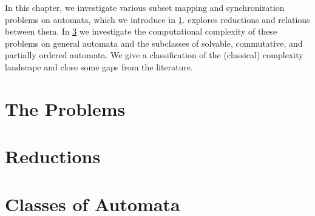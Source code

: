 
In this chapter, we investigate various subset mapping and synchronization problems on automata,
which we introduce in \cref{compl:sec:problems}.
 explores
reductions and relations between them.
In \cref{compl:sec:subclasses} we investigate the computational
complexity of these problems on general automata
and the subclasses of solvable, commutative, and partially
ordered automata. We give a classification of the (classical) 
complexity landscape and close some gaps from the literature.

\section{The Problems}
\label{compl:sec:problems}



\section{Reductions}
\label{compl:sec:reductions}



\section{Classes of Automata}
\label{compl:sec:subclasses}


